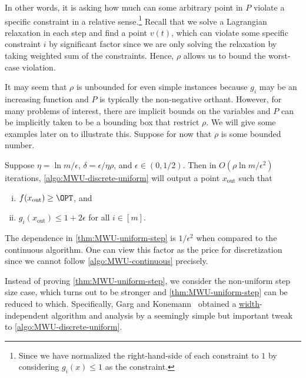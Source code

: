 In other words, it is asking how much can some arbitrary point in \(P\) violate a specific constraint in a relative sense.\footnote{Since we have normalized the right-hand-side of each constraint to \(1\) by considering \(g_i(x) \leq 1\) as the constraint.} Recall that we solve a Lagrangian relaxation in each step and find a point \(v(t)\), which can violate some specific constraint \(i\) by  significant factor since we are only solving the relaxation by taking weighted sum of the constraints. Hence, \(\rho \) allows us to bound the worst-case violation.

It may seem that \(\rho \) is unbounded for even simple instances because \(g_i\) may be an increasing function and \(P\) is typically the non-negative orthant. However, for many problems of interest, there are implicit bounds on the variables and \(P\) can be implicitly taken to be a bounding box that restrict \(\rho \). We will give some examples later on to illustrate this. Suppose for now that \(\rho \) is some bounded number.

\begin{theorem}\label{thm:MWU-uniform-step}
	Suppose \(\eta = \ln m / \epsilon \), \(\delta = \epsilon / \eta \rho \), and \(\epsilon \in (0, 1 / 2)\). Then in \(O(\rho \ln m / \epsilon ^2)\) iterations, \autoref{algo:MWU-discrete-uniform} will output a point \(x_{\text{out} }\) such that
	\begin{enumerate}[(i)]
		\item \(f(x_{\text{out} }) \geq \OPT\), and
		\item \(g_i(x_{\text{out} }) \leq 1 + 2\epsilon \) for all \(i \in [m]\).
	\end{enumerate}
\end{theorem}

\begin{remark}
	The dependence in \autoref{thm:MWU-uniform-step} is \(1 / \epsilon ^2\) when compared to the continuous algorithm. One can view this factor as the price for discretization since we cannot follow \autoref{algo:MWU-continuous} precisely.
\end{remark}

Instead of proving \autoref{thm:MWU-uniform-step}, we consider the non-uniform step size case, which turns out to be stronger and \autoref{thm:MWU-uniform-step} can be reduced to which. Specifically, Garg and Konemann~\cite{garg2007faster} obtained a \hyperref[def:width]{width}-independent algorithm and analysis by a seemingly simple but important tweak to \autoref{algo:MWU-discrete-uniform}.

